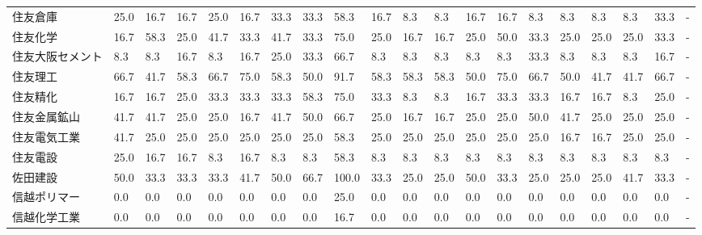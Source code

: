 \documentclass[a4paper，11pt]{jsarticle}
\begin{document}
\begin{longtable}[c]{lp{3mm}p{3mm}p{3mm}p{3mm}p{3mm}p{3mm}p{3mm}p{3mm}p{3mm}p{3mm}p{3mm}p{3mm}p{3mm}p{3mm}p{3mm}p{3mm}p{3mm}p{3mm}p{3mm}}
住友倉庫            &   25.0 &   16.7 &      16.7 &      25.0 &       16.7 &   33.3 &   33.3 &   58.3 &    16.7 &     8.3 &    8.3 &  16.7 &   16.7 &     8.3 &     8.3 &   8.3 &   8.3 &  33.3 &     - \\
住友化学            &   16.7 &   58.3 &      25.0 &      41.7 &       33.3 &   41.7 &   33.3 &   75.0 &    25.0 &    16.7 &   16.7 &  25.0 &   50.0 &    33.3 &    25.0 &  25.0 &  25.0 &  33.3 &     - \\
住友大阪セメント        &    8.3 &    8.3 &      16.7 &       8.3 &       16.7 &   25.0 &   33.3 &   66.7 &     8.3 &     8.3 &    8.3 &   8.3 &    8.3 &    33.3 &     8.3 &   8.3 &   8.3 &  16.7 &     - \\
住友理工            &   66.7 &   41.7 &      58.3 &      66.7 &       75.0 &   58.3 &   50.0 &   91.7 &    58.3 &    58.3 &   58.3 &  50.0 &   75.0 &    66.7 &    50.0 &  41.7 &  41.7 &  66.7 &     - \\
住友精化            &   16.7 &   16.7 &      25.0 &      33.3 &       33.3 &   33.3 &   58.3 &   75.0 &    33.3 &     8.3 &    8.3 &  16.7 &   33.3 &    33.3 &    16.7 &  16.7 &   8.3 &  25.0 &     - \\
住友金属鉱山          &   41.7 &   41.7 &      25.0 &      25.0 &       16.7 &   41.7 &   50.0 &   66.7 &    25.0 &    16.7 &   16.7 &  25.0 &   25.0 &    50.0 &    41.7 &  25.0 &  25.0 &  25.0 &     - \\
住友電気工業          &   41.7 &   25.0 &      25.0 &      25.0 &       25.0 &   25.0 &   25.0 &   58.3 &    25.0 &    25.0 &   25.0 &  25.0 &   25.0 &    25.0 &    16.7 &  16.7 &  25.0 &  25.0 &     - \\
住友電設            &   25.0 &   16.7 &      16.7 &       8.3 &       16.7 &    8.3 &    8.3 &   58.3 &     8.3 &     8.3 &    8.3 &   8.3 &    8.3 &     8.3 &     8.3 &   8.3 &   8.3 &   8.3 &     - \\
佐田建設            &   50.0 &   33.3 &      33.3 &      33.3 &       41.7 &   50.0 &   66.7 &  100.0 &    33.3 &    25.0 &   25.0 &  50.0 &   33.3 &    25.0 &    25.0 &  25.0 &  41.7 &  33.3 &     - \\
信越ポリマー          &    0.0 &    0.0 &       0.0 &       0.0 &        0.0 &    0.0 &    0.0 &   25.0 &     0.0 &     0.0 &    0.0 &   0.0 &    0.0 &     0.0 &     0.0 &   0.0 &   0.0 &   0.0 &     - \\
信越化学工業          &    0.0 &    0.0 &       0.0 &       0.0 &        0.0 &    0.0 &    0.0 &   16.7 &     0.0 &     0.0 &    0.0 &   0.0 &    0.0 &     0.0 &     0.0 &   0.0 &   0.0 &   0.0 &     - \\

\end{longtable}
\end{document}
